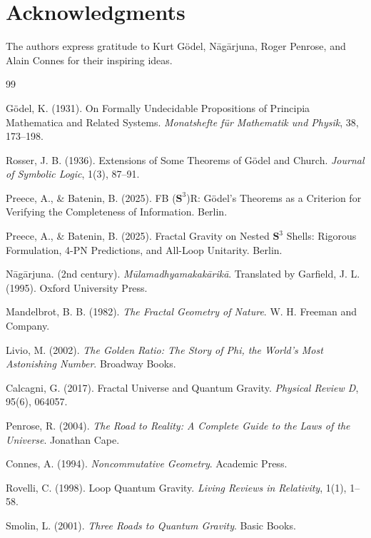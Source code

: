 \documentclass[a4paper,12pt]{article}
\begin{document}
\section*{Acknowledgments}
The authors express gratitude to Kurt Gödel, Nāgārjuna, Roger Penrose, and Alain Connes for their inspiring ideas.

\begin{thebibliography}{99}

 Gödel, K. (1931). On Formally Undecidable Propositions of Principia Mathematica and Related Systems. \textit{Monatshefte für Mathematik und Physik}, 38, 173--198.

 Rosser, J. B. (1936). Extensions of Some Theorems of Gödel and Church. \textit{Journal of Symbolic Logic}, 1(3), 87--91.

 Preece, A., \& Batenin, B. (2025). FB ($\mathbf{S}^3$)R: Gödel's Theorems as a Criterion for Verifying the Completeness of Information. Berlin.

 Preece, A., \& Batenin, B. (2025). Fractal Gravity on Nested $\mathbf{S}^3$ Shells: Rigorous Formulation, 4-PN Predictions, and All-Loop Unitarity. Berlin.

 Nāgārjuna. (2nd century). \textit{Mūlamadhyamakakārikā}. Translated by Garfield, J. L. (1995). Oxford University Press.

 Mandelbrot, B. B. (1982). \textit{The Fractal Geometry of Nature}. W. H. Freeman and Company.

 Livio, M. (2002). \textit{The Golden Ratio: The Story of Phi, the World's Most Astonishing Number}. Broadway Books.

 Calcagni, G. (2017). Fractal Universe and Quantum Gravity. \textit{Physical Review D}, 95(6), 064057.

 Penrose, R. (2004). \textit{The Road to Reality: A Complete Guide to the Laws of the Universe}. Jonathan Cape.

 Connes, A. (1994). \textit{Noncommutative Geometry}. Academic Press.

 Rovelli, C. (1998). Loop Quantum Gravity. \textit{Living Reviews in Relativity}, 1(1), 1--58.

 Smolin, L. (2001). \textit{Three Roads to Quantum Gravity}. Basic Books.

\end{thebibliography}
\end{document}
